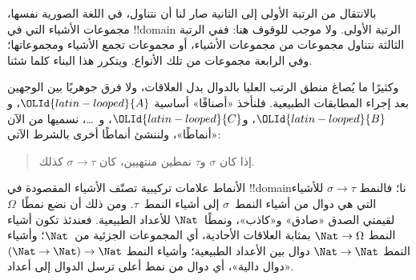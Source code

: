 \documentclass[../../../include/open-logic-section]{subfiles}
\begin{document}


بالانتقال من الرتبة الأولى إلى الثانية صار لنا أن نتناول، في
اللغة الصورية نفسها، مجموعات الأشياء التي في !!{domain}
الرتبة الأولى. ولا موجب للوقوف هنا: ففي الرتبة الثالثة نتناول
مجموعات من مجموعات الأشياء، أو مجموعات تجمع الأشياء ومجموعاتها؛
وفي الرابعة مجموعات من تلك الأنواع. ويتكرر هذا البناء كلما شئنا.

وكثيرًا ما يُصاغ منطق الرتب العليا بالدوال بدل العلاقات، ولا
فرق جوهريًا بين الوجهين بعد إجراء المطابقات الطبيعية. فلنأخذ
«أصنافًا» أساسية ${\OLId{latin-looped}{A}}$، و${\OLId{latin-looped}{B}}$، و${\OLId{latin-looped}{C}}$، و~\dots، نسميها من الآن
«أنماطًا»، ولننشئ أنماطًا أخرى بالشرط الآتي:
\begin{quote}
إذا كان $\sigma$ و$\tau$ نمطين منتهيين، كان $\sigma \to \tau$ كذلك.
\end{quote}
الأنماط علامات تركيبية تصنّف الأشياء المقصودة في
!!{domain}نا؛ فالنمط $\sigma \to \tau$ للأشياء التي هي دوال
من أشياء النمط~$\sigma$ إلى أشياء النمط~$\tau$. ومن ذلك أن
نضع نمطًا~$\Omega$ لقيمتي الصدق «صادق» و«كاذب»، ونمطًا~$\Nat$
للأعداد الطبيعية. فعندئذ تكون أشياء النمط $\Nat \to \Omega$
بمثابة العلاقات الأحادية، أي المجموعات الجزئية من~$\Nat$؛
وأشياء النمط $\Nat \to
\Nat$ دوال بين الأعداد الطبيعية؛ وأشياء النمط
$(\Nat \to \Nat) \to \Nat$ «دوال دالية»، أي دوال من نمط أعلى
ترسل الدوال إلى أعداد.
\end{document}
